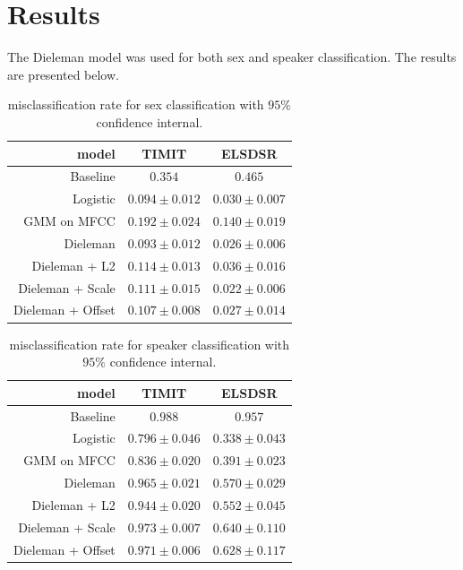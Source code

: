 \section{Results}

The Dieleman model was used for both sex and speaker classification. The results are presented below.

\begin{table}[H]
\centering
\begin{tabular}{r|c|c}
model & TIMIT & ELSDSR \\ \hline
                    Baseline & $0.354$ & $0.465$ \\
                    Logistic & $0.094 \pm 0.012$ & $0.030 \pm 0.007$ \\
                 GMM on MFCC & $0.192 \pm 0.024$ & $0.140 \pm 0.019$ \\
                    Dieleman & $0.093 \pm 0.012$ & $0.026 \pm 0.006$ \\
     Dieleman + L2 & $0.114 \pm 0.013$ & $0.036 \pm 0.016$ \\
  Dieleman + Scale & $0.111 \pm 0.015$ & $0.022 \pm 0.006$ \\
 Dieleman + Offset & $0.107 \pm 0.008$ & $0.027 \pm 0.014$ \\
\end{tabular}
\caption{misclassification rate for sex classification with $95\%$ confidence internal.}
\end{table}

\begin{table}[H]
\centering
\begin{tabular}{r|c|c}
model & TIMIT & ELSDSR \\ \hline
                    Baseline & $0.988$ & $0.957$ \\
                    Logistic & $0.796 \pm 0.046$ & $0.338 \pm 0.043$ \\
                 GMM on MFCC & $0.836 \pm 0.020$ & $0.391 \pm 0.023$ \\
                    Dieleman & $0.965 \pm 0.021$ & $0.570 \pm 0.029$ \\
     Dieleman + L2 & $0.944 \pm 0.020$ & $0.552 \pm 0.045$ \\
  Dieleman + Scale & $0.973 \pm 0.007$ & $0.640 \pm 0.110$ \\
 Dieleman + Offset & $0.971 \pm 0.006$ & $0.628 \pm 0.117$ \\
\end{tabular}
\caption{misclassification rate for speaker classification with $95\%$ confidence internal.}
\end{table}

